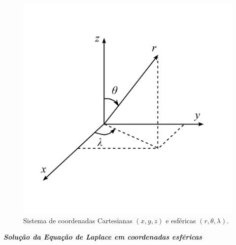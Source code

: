 \documentclass[10pt,a4paper,fleqn]{article}
\begin{document}
\begin{figure}[h]
    \centering
    \includegraphics[scale=1]{Figs/Fig2.png}
    \caption{Sistema de coordenadas Cartesianas $(x,y,z)$ e esf\'{e}ricas $(r,\theta,\lambda)$.}
    \label{fig:fig2}
\end{figure}

\bigskip
\bigskip

\begin{flushleft}
\emph{\textbf{Soluç\~{a}o da Equaç\~{a}o de Laplace em coordenadas esf\'{e}ricas}}
\end{flushleft}

\bigskip
\bigskip
\end{document}
